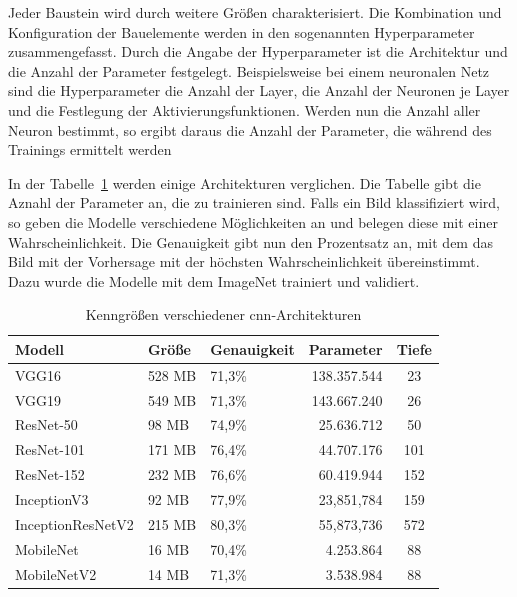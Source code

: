 Jeder Baustein wird durch weitere Größen charakterisiert. Die Kombination und Konfiguration der Bauelemente werden in den sogenannten Hyperparameter zusammengefasst. Durch die Angabe der  Hyperparameter ist die Architektur und die Anzahl der Parameter festgelegt. Beispielsweise bei einem neuronalen Netz sind die Hyperparameter die Anzahl der Layer, die Anzahl der Neuronen je Layer und die Festlegung der Aktivierungsfunktionen. Werden nun die Anzahl aller Neuron bestimmt, so ergibt daraus die Anzahl der Parameter, die während des Trainings ermittelt werden

In der Tabelle~\ref{concept:Parameter} werden einige Architekturen verglichen. Die Tabelle gibt die Aznahl der Parameter an, die zu trainieren sind.  Falls ein Bild klassifiziert wird, so geben die Modelle verschiedene Möglichkeiten an und belegen diese mit einer Wahrscheinlichkeit. Die Genauigkeit gibt nun den Prozentsatz an, mit dem das Bild mit der Vorhersage mit der höchsten Wahrscheinlichkeit übereinstimmt. Dazu wurde die Modelle mit dem ImageNet trainiert und validiert. 




 \begin{table}
   \begin{tabular}{lllrc}
     Modell            & Größe  & Genauigkeit & Parameter   & Tiefe \\ \hline
     VGG16             & 528 MB & 71{,}3\%    & 138.357.544 & 23 \\     
     VGG19             & 549 MB & 71{,}3\%    & 143.667.240 & 26 \\     
     ResNet-50         &  98 MB & 74{,}9\%    &  25.636.712 & 50 \\     
     ResNet-101        & 171 MB & 76{,}4\%    &  44.707.176 & 101 \\     
     ResNet-152        & 232 MB & 76{,}6\%    &  60.419.944 & 152 \\     
     InceptionV3       &  92 MB & 77{,}9\%    &  23,851,784 & 159 \\
     InceptionResNetV2 & 215 MB & 80{,}3\%    &  55,873,736 & 572 \\
     MobileNet         &  16 MB & 70,{4}\%    &   4.253.864 & 88 \\       
     MobileNetV2       &  14 MB & 71,{3}\%    &   3.538.984 & 88 \\       
    \end{tabular}
  \caption{Kenngrößen verschiedener \ac{cnn}-Architekturen}\label{concept:Parameter}
 \end{table}
 
